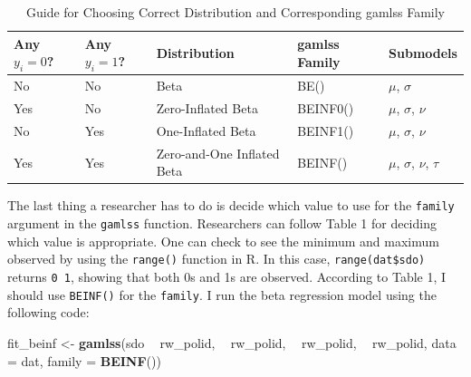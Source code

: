 \documentclass[english,man]{apa6}
\newenvironment{Shaded}{\begin{snugshade}}{\end{snugshade}}
\newcommand{\KeywordTok}[1]{\textcolor[rgb]{0.13,0.29,0.53}{\textbf{#1}}}
\newcommand{\DataTypeTok}[1]{\textcolor[rgb]{0.13,0.29,0.53}{#1}}
\newcommand{\StringTok}[1]{\textcolor[rgb]{0.31,0.60,0.02}{#1}}
\newcommand{\OperatorTok}[1]{\textcolor[rgb]{0.81,0.36,0.00}{\textbf{#1}}}
\newcommand{\NormalTok}[1]{#1}
\theoremstyle{definition}
\theoremstyle{definition}
\theoremstyle{remark}
\begin{document}
\begin{table}[tbp]
\begin{center}
\begin{threeparttable}
\caption{\label{tab:unnamed-chunk-14}Guide for Choosing Correct Distribution and Corresponding gamlss Family}
\begin{tabular}{lllll}
\toprule
Any $y_i = 0$? & Any $y_i = 1$? & Distribution & gamlss Family & Submodels\\
\midrule
No & No & Beta & BE() & $\mu$, $\sigma$\\
Yes & No & Zero-Inflated Beta & BEINF0() & $\mu$, $\sigma$, $\nu$\\
No & Yes & One-Inflated Beta & BEINF1() & $\mu$, $\sigma$, $\nu$\\
Yes & Yes & Zero-and-One Inflated Beta & BEINF() & $\mu$, $\sigma$, $\nu$, $\tau$\\
\bottomrule
\end{tabular}
\end{threeparttable}
\end{center}
\end{table}

The last thing a researcher has to do is decide which value to use for
the \texttt{family} argument in the \texttt{gamlss} function.
Researchers can follow Table 1 for deciding which value is appropriate.
One can check to see the minimum and maximum observed by using the
\texttt{range()} function in R. In this case, \texttt{range(dat\$sdo)}
returns \texttt{0\ 1}, showing that both 0s and 1s are observed.
According to Table 1, I should use \texttt{BEINF()} for the
\texttt{family}. I run the beta regression model using the following
code:

\begin{Shaded}
\begin{Highlighting}[]
\NormalTok{fit_beinf <-}\StringTok{ }\KeywordTok{gamlss}\NormalTok{(sdo }\OperatorTok{~}\StringTok{ }\NormalTok{rw_polid, }\OperatorTok{~}\StringTok{ }\NormalTok{rw_polid, }\OperatorTok{~}\StringTok{ }\NormalTok{rw_polid, }\OperatorTok{~}\StringTok{ }\NormalTok{rw_polid,}
                    \DataTypeTok{data =}\NormalTok{ dat, }\DataTypeTok{family =} \KeywordTok{BEINF}\NormalTok{())}
\end{Highlighting}
\end{Shaded}
\end{document}
